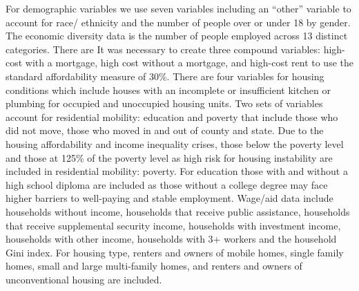 For demographic variables we use seven variables including an “other” variable to account for race/ ethnicity and the number of people over or under 18 by gender. The economic diversity data is the number of people employed across 13 distinct categories. There are It was necessary to create three compound variables: high-cost with a mortgage, high cost without a mortgage, and high-cost rent to use the standard affordability measure of 30\%. There are four variables for housing conditions which include houses with an incomplete or insufficient kitchen or plumbing for occupied and unoccupied housing units. Two sets of variables account for residential mobility: education and poverty that include those who did not move, those who moved in and out of county and state.  Due to the housing affordability and income inequality crises, those below the poverty level and those at 125\% of the poverty level as high risk for housing instability are included in residential mobility: poverty. For education those with and without a high school diploma are included as those without a college degree may face higher barriers to well-paying and stable employment. Wage/aid data include households without income, households that receive public assistance, households that receive supplemental security income, households with investment income, households with other income, households with 3+ workers and the household Gini index. For housing type, renters and owners of mobile homes, single family homes, small and large multi-family homes, and renters and owners of unconventional housing are included.  
\endinput